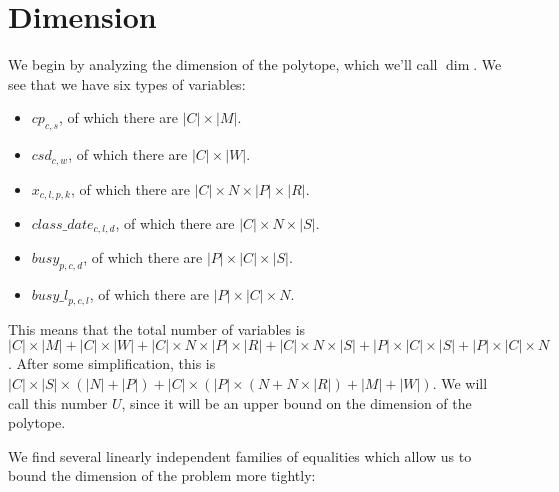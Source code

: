 \section{Dimension}

We begin by analyzing the dimension of the polytope, which we'll call $\dim$. We see that we have six types of variables:
\begin{itemize}
\item $cp_{c, s}$, of which there are $|C| \times |M|$.
\item $csd_{c, w}$, of which there are $|C| \times |W|$.
\item $x_{c, l, p, k}$, of which there are $|C| \times N \times |P| \times |R|$.
\item $class\_date_{c, l, d}$, of which there are $|C| \times N \times |S|$.
\item $busy_{p, c, d}$, of which there are $|P| \times |C| \times |S|$.
\item $busy\_l_{p, c, l}$, of which there are $|P| \times |C| \times N$.
\end{itemize}

This means that the total number of variables is $|C| \times |M| + |C| \times |W| + |C| \times N \times |P| \times |R| + |C| \times N \times |S| + |P| \times |C| \times |S| + |P| \times |C| \times N$. After some simplification, this is $|C| \times |S| \times (|N| + |P|) + |C| \times (|P| \times (N + N \times |R|) +|M| + |W|)$. We will call this number $U$, since it will be an upper bound on the dimension of the polytope.


We find several linearly independent families of equalities which allow us to bound the dimension of the problem more tightly:

